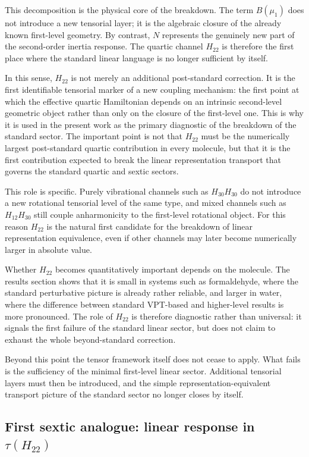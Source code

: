 This decomposition is the physical core of the breakdown. The term
$B(\mu_1)$ does not introduce a new tensorial layer; it is the
algebraic closure of the already known first-level geometry. By
contrast, $N$ represents the genuinely new part of the second-order
inertia response. The quartic channel $H_{22}$ is therefore the first
place where the standard linear language is no longer sufficient by
itself.

In this sense, $H_{22}$ is not merely an additional post-standard
correction. It is the first identifiable tensorial marker of a new
coupling mechanism: the first point at which the effective quartic
Hamiltonian depends on an intrinsic second-level geometric object
rather than only on the closure of the first-level one. This is why
it is used in the present work as the primary diagnostic of the
breakdown of the standard sector. The important point is not that
$H_{22}$ must be the numerically largest post-standard quartic
contribution in every molecule, but that it is the first contribution
expected to break the linear representation transport that governs the
standard quartic and sextic sectors.

This role is specific. Purely vibrational channels such as
$H_{30}H_{30}$ do not introduce a new rotational tensorial level of
the same type, and mixed channels such as $H_{12}H_{30}$ still couple
anharmonicity to the first-level rotational object. For this reason
$H_{22}$ is the natural first candidate for the breakdown of linear
representation equivalence, even if other channels may later become
numerically larger in absolute value.

Whether $H_{22}$ becomes quantitatively important depends on the
molecule. The results section shows that it is small in systems such
as formaldehyde, where the standard perturbative picture is already
rather reliable, and larger in water, where the difference between
standard VPT-based and higher-level results is more pronounced. The
role of $H_{22}$ is therefore diagnostic rather than universal: it
signals the first failure of the standard linear sector, but does not
claim to exhaust the whole beyond-standard correction.

Beyond this point the tensor framework itself does not cease to apply.
What fails is the sufficiency of the minimal first-level linear sector.
Additional tensorial layers must then be introduced, and the simple
representation-equivalent transport picture of the standard sector no
longer closes by itself.

\subsection{First sextic analogue: linear response in \texorpdfstring{$\tau(H_{22})$}{tau(H22)}}

